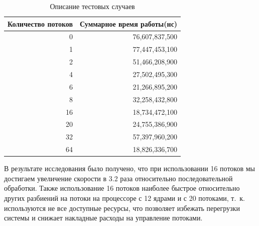 \begin{table}[h]
    \begin{center}
        \begin{threeparttable}
    \caption{Описание тестовых случаев}
    \captionsetup{justification=raggedright, singlelinecheck=false}
    \label{tbl:mes}
    \begin{tabular}{|r|r|}
        \hline
        \textbf{Количество потоков} & \textbf{Суммарное время работы(нс)} \\
        \hline
        0 & 76,607,837,500 \\
        \hline
        1 & 77,447,453,100 \\
        \hline
        2 & 51,466,208,900 \\
        \hline
        4 & 27,502,495,300 \\
        \hline
        6 & 21,266,895,200 \\
        \hline
        8 & 32,258,432,800 \\
        \hline
        16 & 18,734,472,100 \\
        \hline
        20 & 24,755,386,900 \\
        \hline
        32 & 57,397,960,200 \\
        \hline
        64 & 18,826,336,700 \\
        \hline
    \end{tabular}
    \end{threeparttable}
    \end{center}
\end{table}

В результате исследования было получено, что при использовании 16 потоков мы достигаем увеличение скорости в 3.2 раза относительно последовательной обработки. Также использование 16 потоков наиболее быстрое относительно других разбиений на потоки на процессоре с 12 ядрами и с 20 потоками, т.~к. используются не все доступные ресурсы, что позволяет избежать перегрузки системы и снижает накладные расходы на управление потоками.

\clearpage